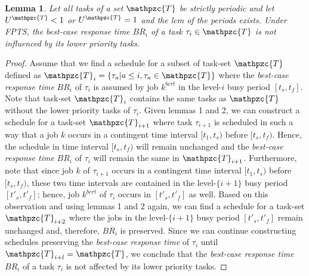 \documentclass[fleqn]{article}
\newtheorem{lemma}{Lemma}
\begin{document}

\begin{lemma}
	Let all tasks of a set $\mathpzc{T}$ be strictly periodic and let $U^{\mathpzc{T}}<1$ or $U^{\mathpzc{T}}=1$ and the lcm of the periods exists. Under FPTS, the best-case response time $BR_i$ of a task $\tau_i \in \mathpzc{T}$ is not influenced by its lower priority tasks.
\end{lemma}

\begin{proof}
	Assume that we find a schedule for a subset of task-set $\mathpzc{T}$ defined as $\mathpzc{T}_i = \{\tau_a | a \leq i, \tau_a \in \mathpzc{T}\}$ where the \textit{best-case response time} $BR_i$ of $\tau_i$ is assumed by job $k^{bcrt}$ in the level-$i$ busy period $[t_{s},t_{f}]$. Note that task-set $\mathpzc{T}_i$ contains the same tasks as $\mathpzc{T}$ without the lower priority tasks of $\tau_i$. Given lemmas 1 and 2, we can construct a schedule for a task-set $\mathpzc{T}_{i+1}$ where task $\tau_{i+1}$ is scheduled in such a way that a job $k$ occurs in a contingent time interval $[t_1, t_s)$ before $[t_s,t_f)$. Hence, the schedule in time interval $[t_s,t_f)$ will remain unchanged and the \textit{best-case response time} $BR_i$ of $\tau_i$ will remain the same in $\mathpzc{T}_{i+1}$. Furthermore, note that since job $k$ of $\tau_{i+1}$ occurs in a contingent time interval $[t_1, t_s)$ before $[t_s,t_f)$, these two time intervals are contained in the level-$\{i+1\}$ busy period $[t\prime_s,t\prime_f]$; hence, job $k^{bcrt}$ of $\tau_i$ occurs in $[t\prime_s,t\prime_f]$ as well. Based on this observation and using lemmas 1 and 2 again, we can find a schedule for a task-set $\mathpzc{T}_{i+2}$ where the jobs in the  level-$\{i+1\}$ busy period $[t\prime_s,t\prime_f]$ remain unchanged and, therefore, $BR_i$ is preserved. Since we can continue constructing schedules preserving the \textit{best-case response time} of $\tau_i$ until $\mathpzc{T}_{i+l} = \mathpzc{T}$, we conclude that the \textit{best-case response time} $BR_i$ of a task $\tau_i$ is not affected by its lower priority tasks.
\end{proof}
\end{document}
